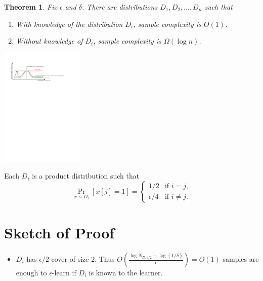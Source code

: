 \documentclass[30pt,landscape]{sciposter}
\newtheorem*{theorem}{Theorem}
\begin{document}
\begin{multicols}{3}
\vspace{1cm}

\begin{theorem}
Fix $\epsilon$ and $\delta$. There are distributions $D_1, D_2, \dots, D_n$ such that
\begin{enumerate}
\item With knowledge of the distribution $D_i$, sample complexity is $O(1)$.
\item Without knowledge of $D_i$, sample complexity is $\Omega(\log n)$.
\end{enumerate}
\end{theorem}

\vspace{1cm}

\begin{center}
\includegraphics[width=0.3\textwidth]{figure-2}
\end{center}

\vspace{1cm}


Each $D_i$ is a product distribution such that
$$
\Pr_{x \sim D_i}[x[j] = 1] =
\begin{cases}
1/2 & \text{if $i = j$,} \\
\epsilon/4 & \text{if $i \neq j$.}
\end{cases}
$$

\columnbreak

\section*{Sketch of Proof}

\begin{itemize}
\item $D_i$ has $\epsilon/2$-cover of size $2$. Thus $O\left(\frac{\log N_{D,\epsilon/2} + \log(1/\delta)}{\epsilon} \right) = O(1)$
samples are enough to $\epsilon$-learn if $D_i$ is known to the learner.

\vspace{1cm}


\end{itemize}
\end{multicols}
\end{document}
